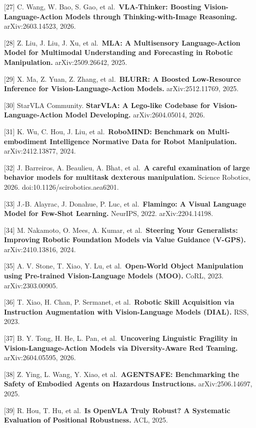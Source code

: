 {[}27{]} C. Wang, W. Bao, S. Gao, et al.~\textbf{VLA-Thinker: Boosting Vision-Language-Action Models through Thinking-with-Image Reasoning.} arXiv:2603.14523, 2026.

{[}28{]} Z. Liu, J. Liu, J. Xu, et al.~\textbf{MLA: A Multisensory Language-Action Model for Multimodal Understanding and Forecasting in Robotic Manipulation.} arXiv:2509.26642, 2025.

{[}29{]} X. Ma, Z. Yuan, Z. Zhang, et al.~\textbf{BLURR: A Boosted Low-Resource Inference for Vision-Language-Action Models.} arXiv:2512.11769, 2025.

{[}30{]} StarVLA Community. \textbf{StarVLA: A Lego-like Codebase for Vision-Language-Action Model Developing.} arXiv:2604.05014, 2026.

{[}31{]} K. Wu, C. Hou, J. Liu, et al.~\textbf{RoboMIND: Benchmark on Multi-embodiment Intelligence Normative Data for Robot Manipulation.} arXiv:2412.13877, 2024.

{[}32{]} J. Barreiros, A. Beaulieu, A. Bhat, et al.~\textbf{A careful examination of large behavior models for multitask dexterous manipulation.} Science Robotics, 2026. doi:10.1126/scirobotics.aea6201.

{[}33{]} J.-B. Alayrac, J. Donahue, P. Luc, et al.~\textbf{Flamingo: A Visual Language Model for Few-Shot Learning.} NeurIPS, 2022. arXiv:2204.14198.

{[}34{]} M. Nakamoto, O. Mees, A. Kumar, et al.~\textbf{Steering Your Generalists: Improving Robotic Foundation Models via Value Guidance (V-GPS).} arXiv:2410.13816, 2024.

{[}35{]} A. V. Stone, T. Xiao, Y. Lu, et al.~\textbf{Open-World Object Manipulation using Pre-trained Vision-Language Models (MOO).} CoRL, 2023. arXiv:2303.00905.

{[}36{]} T. Xiao, H. Chan, P. Sermanet, et al.~\textbf{Robotic Skill Acquisition via Instruction Augmentation with Vision-Language Models (DIAL).} RSS, 2023.

{[}37{]} B. Y. Tong, H. He, L. Pan, et al.~\textbf{Uncovering Linguistic Fragility in Vision-Language-Action Models via Diversity-Aware Red Teaming.} arXiv:2604.05595, 2026.

{[}38{]} Z. Ying, L. Wang, Y. Xiao, et al.~\textbf{AGENTSAFE: Benchmarking the Safety of Embodied Agents on Hazardous Instructions.} arXiv:2506.14697, 2025.

{[}39{]} R. Hou, T. Hu, et al.~\textbf{Is OpenVLA Truly Robust? A Systematic Evaluation of Positional Robustness.} ACL, 2025.

